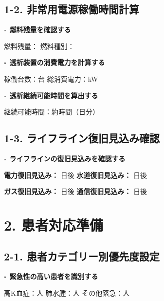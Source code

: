\documentclass[a4paper,12pt]{jarticle}
\newcommand{\checkbox}{$\square$\ }
\newcommand{\underlinespace}[1]{\underline{\hspace{#1}}}
\begin{document}
\vspace{5mm}

\subsection*{1-2. 非常用電源稼働時間計算}

\checkbox \textbf{燃料残量を確認する}

\quad 燃料残量：\underlinespace{4cm} \quad 燃料種別：\underlinespace{4cm}

\vspace{3mm}

\checkbox \textbf{透析装置の消費電力を計算する}

\quad 稼働台数：\underlinespace{2cm}台 \quad 総消費電力：\underlinespace{4cm}kW

\vspace{3mm}

\checkbox \textbf{透析継続可能時間を算出する}

\quad 継続可能時間：約\underlinespace{3cm}時間（\underlinespace{2cm}日分）

\vspace{5mm}

\subsection*{1-3. ライフライン復旧見込み確認}

\checkbox \textbf{ライフラインの復旧見込みを確認する}

\quad \textbf{電力復旧見込み：} \underlinespace{2cm}日後 \quad \textbf{水道復旧見込み：} \underlinespace{2cm}日後

\quad \textbf{ガス復旧見込み：} \underlinespace{2cm}日後 \quad \textbf{通信復旧見込み：} \underlinespace{2cm}日後

\vspace{5mm}

\newpage

\section*{2. 患者対応準備}

\subsection*{2-1. 患者カテゴリー別優先度設定}

\checkbox \textbf{緊急性の高い患者を識別する}

\quad 高K血症：\underlinespace{2cm}人 \quad 肺水腫：\underlinespace{2cm}人 \quad その他緊急：\underlinespace{2cm}人
\end{document}
